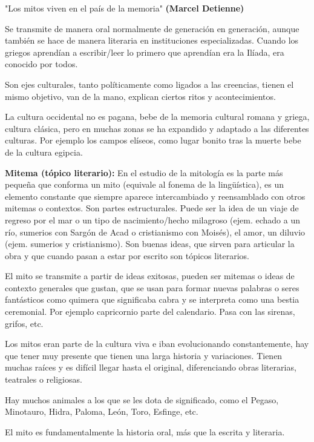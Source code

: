 "Los mitos viven en el país de la memoria" \textbf{(Marcel Detienne)}

Se transmite de manera oral normalmente de generación en generación, aunque también se hace de manera literaria en instituciones especializadas. Cuando los griegos aprendían a escribir/leer lo primero que aprendían era la Ilíada, era conocido por todos.

Son ejes culturales, tanto políticamente como ligados a las creencias, tienen el mismo objetivo, van de la mano, explican ciertos ritos y acontecimientos.

La cultura occidental no es pagana, bebe de la memoria cultural romana y griega, cultura clásica, pero en muchas zonas se ha expandido y adaptado a las diferentes culturas. Por ejemplo los campos elíseos, como lugar bonito tras la muerte bebe de la cultura egipcia.

\textbf{Mitema (tópico literario):} En el estudio de la mitología es la parte más pequeña que conforma un mito (equivale al fonema de la lingüística), es un elemento constante que siempre aparece intercambiado y reensamblado con otros mitemas o contextos. Son partes estructurales. Puede ser la idea de un viaje de regreso por el mar o un tipo de nacimiento/hecho milagroso (ejem. echado a un río, sumerios con Sargón de Acad o cristianismo con Moisés), el amor, un diluvio (ejem. sumerios y cristianismo). Son buenas ideas, que sirven para articular la obra y que cuando pasan a estar por escrito son tópicos literarios.

El mito se transmite a partir de ideas exitosas, pueden ser mitemas o ideas de contexto generales que gustan, que se usan para formar nuevas palabras o seres fantásticos como quimera que significaba cabra y se interpreta como una bestia ceremonial. Por ejemplo capricornio parte del calendario. Pasa con las sirenas, grifos, etc.

Los mitos eran parte de la cultura viva e iban evolucionando constantemente, hay que tener muy presente que tienen una larga historia y variaciones. Tienen muchas raíces y es difícil llegar hasta el original, diferenciando obras literarias, teatrales o religiosas.

Hay muchos animales a los que se les dota de significado, como el Pegaso, Minotauro, Hidra, Paloma, León, Toro, Esfinge, etc.

El mito es fundamentalmente la historia oral, más que la escrita y literaria.